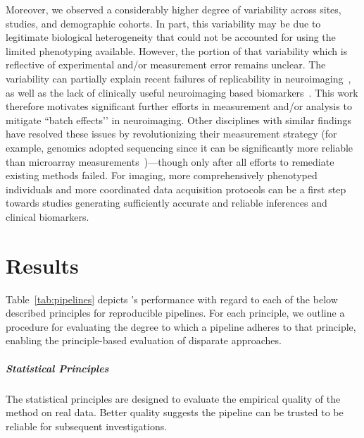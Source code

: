 \documentclass[11pt]{article}
\begin{document}
\begin{multicols}{2}
Moreover, we observed a considerably higher degree of variability across sites, studies, and demographic cohorts.
In part, this variability may be due to legitimate biological heterogeneity that could not be accounted for using the limited phenotyping available.
However, the portion of that variability which is reflective of experimental and/or measurement error remains unclear.
The variability can partially explain recent failures of replicability in neuroimaging~\cite{Button2013}, as well as the lack of clinically useful neuroimaging based biomarkers~\cite{APA12}.
This work therefore motivates significant further efforts in measurement and/or analysis to mitigate ``batch effects’’ in neuroimaging.
Other disciplines with similar findings have resolved these issues by revolutionizing their measurement strategy (for example, genomics adopted sequencing since it can be significantly more reliable than microarray measurements~\cite{SEQCMAQC-III_Consortium2014-ij})---though only after all efforts to remediate existing methods failed.
For imaging, more comprehensively phenotyped individuals and more coordinated data acquisition protocols can be a first step towards studies generating sufficiently accurate and reliable inferences and clinical biomarkers.



%

\section{Results}
\label{sec:results}

Table~\ref{tab:pipelines} depicts \ndmg's performance with regard to each of the below described principles for reproducible pipelines.
For each principle, we outline a procedure for evaluating the degree to which a pipeline adheres to that principle, enabling the principle-based evaluation of disparate approaches.

\subparagraph*{Statistical Principles}
The statistical principles are designed to evaluate the empirical quality of the method on real data.
Better quality suggests the pipeline can be trusted to be reliable for subsequent investigations.


\end{multicols}
\end{document}

